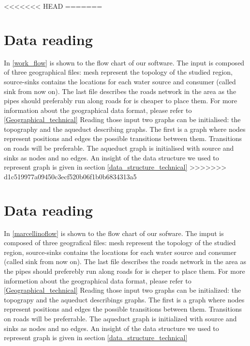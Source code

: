 <<<<<<< HEAD
=======
\section {Data reading}
In \ref {work_flow} is shown to the flow chart of our software. 
The input is composed of three geographical files: mesh represent the topology of the studied region, source-sinks contains the locations for each water source and consumer (called sink from now on). The last file describes the roads network in the area as the pipes should preferably run along roads for is cheaper to place them. For more information about the geographical data format, please refer to \ref{Geographical_technical}
Reading those input two graphs can be initialised: the topography and the aqueduct describing graphs. The first is a graph where nodes represent positions and edges the possible transitions between them. Transitions on roads will be preferable. The aqueduct graph is initialised with source and sinks as nodes and no edges. An insight of the data structure we used to represent graph is given in section \ref {data_structure_technical}
>>>>>>> d1c519977a09450c3ecf520b06f1b0b6834313a5

\section{Data reading}
In \ref{marcellinoflow} is shown to the flow chart of our sofware. 
The imput is composed of three geografical files: mesh represent the topology of the studied region, 
source-sinks contains the locations for each water source and consumer (called sink from now on). 
The last file describes the roads network in the area as the pipes should preferebly run along roads 
for is cheper to place them. For more informetion about the geographical data format, please refer to
 \ref{Geographical_technical} Reading those input two graphs can be initialized: the topograpy and the 
 aqueduct describings graphs. The first is a graph where nodes represent positions and edges the 
 possible transitions between them. Transitions on roads will be preferrable. The aqueduct graph is 
 initialized with source and sinks as nodes and no edges. An insight of the data structure we used to 
 represent graph is given in section \ref{data_structure_technical}


